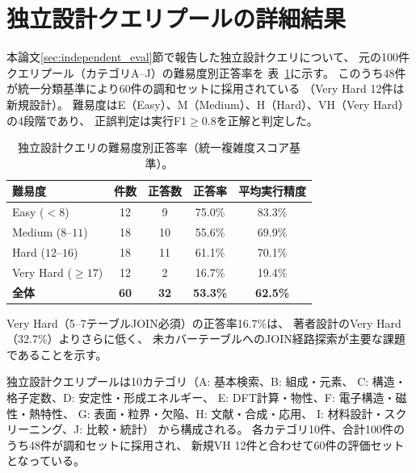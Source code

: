 \documentclass[5p,twocolumn]{elsarticle}
\begin{document}
\section{独立設計クエリプールの詳細結果}
\label{sec:sup_expert_queries}

本論文\ref{sec:independent_eval}節で報告した独立設計クエリについて、
元の100件クエリプール（カテゴリA--J）の難易度別正答率を
表~\ref{tab:sup_expert_category}に示す。
このうち48件が統一分類基準により60件の調和セットに採用されている
（Very Hard 12件は新規設計）。
難易度はE（Easy）、M（Medium）、H（Hard）、VH（Very Hard）の4段階であり、
正誤判定は実行F1$\geq 0.8$を正解と判定した。

\begin{table}[htbp]
  \centering
  \caption{独立設計クエリの難易度別正答率（統一複雑度スコア基準）。}
  \label{tab:sup_expert_category}
  \small
  \begin{tabular}{lcccc}
    \toprule
    難易度 & 件数 & 正答数 & 正答率 & 平均実行精度 \\
    \midrule
    Easy ($< 8$) & 12 & 9 & 75.0\% & 83.3\% \\
    Medium ($8$--$11$) & 18 & 10 & 55.6\% & 69.9\% \\
    Hard ($12$--$16$) & 18 & 11 & 61.1\% & 70.1\% \\
    Very Hard ($\geq 17$) & 12 & 2 & 16.7\% & 19.4\% \\
    \midrule
    \textbf{全体} & \textbf{60} & \textbf{32} & \textbf{53.3\%} & \textbf{62.5\%} \\
    \bottomrule
  \end{tabular}
\end{table}

Very Hard（5--7テーブルJOIN必須）の正答率16.7\%は、
著者設計のVery Hard（32.7\%）よりさらに低く、
未カバーテーブルへのJOIN経路探索が主要な課題であることを示す。

独立設計クエリプールは10カテゴリ（A: 基本検索、B: 組成・元素、
C: 構造・格子定数、D: 安定性・形成エネルギー、
E: DFT計算・物性、F: 電子構造・磁性・熱特性、
G: 表面・粒界・欠陥、H: 文献・合成・応用、
I: 材料設計・スクリーニング、J: 比較・統計）
から構成される。
各カテゴリ10件、合計100件のうち48件が調和セットに採用され、
新規VH 12件と合わせて60件の評価セットとなっている。
\end{document}
